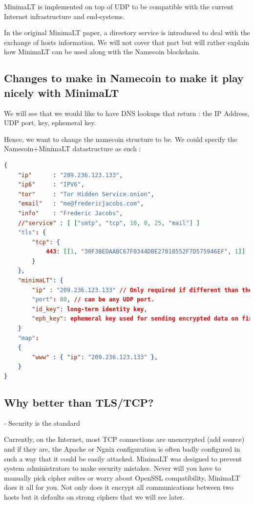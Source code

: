 \documentclass{vldb}
\begin{document}
MinimaLT is implemented on top of UDP to be compatible with the current Internet infrastructure and end-systems.

In the original MinimaLT paper, a directory service is introduced to deal with the exchange of hosts information. We will not cover that part but will rather explain how MinimaLT can be used along with the Namecoin blockchain.

\subsection{Changes to make in Namecoin to make it play nicely with MinimaLT}

We will see that we would like to have DNS lookups that return : the IP Address, UDP port, key, ephemeral key.

Hence, we want to change the namecoin structure to be. We could specify the Namecoin+MinimaLT datastructure as such :
\begin{lstlisting}[language=json,firstnumber=1]
{
    "ip"      : "209.236.123.133",
    "ip6"     : "IPV6",
    "tor"     : "Tor Hidden Service.onion",
    "email"   : "me@fredericjacobs.com",
    "info"    : "Frederic Jacobs",
    //"service" : [ ["smtp", "tcp", 10, 0, 25, "mail"] ]
    "tls": {
        "tcp": {
            443: [[1, "30F38EDAABC67F0344DBE27018552F7D575946EF", 1]]
        }
    },
    "minimaLT": {
        "ip" : "209.236.123.133" // Only required if different than the default one
        "port": 80, // can be any UDP port.
        "id_key": long-term identity key,
        "eph_key": ephemeral key used for sending encrypted data on first RTT.
    }
    "map":
    {
        "www" : { "ip": "209.236.123.133" },
    }
}
\end{lstlisting}


\subsection{Why better than TLS/TCP?}

- Security is the standard

Currently, on the Internet, most TCP connections are unencrypted (add source) and if they are, the Apache or Ngnix configuration is often badly configured in such a way that it could be easily attacked. MinimaLT was designed to prevent system administrators to make security mistakes. Never will you have to manually pick cipher suites or worry about OpenSSL compatibility, MinimaLT does it all for you. Not only does it encrypt all communications between two hosts but it defaults on strong ciphers that we will see later.
\end{document}
